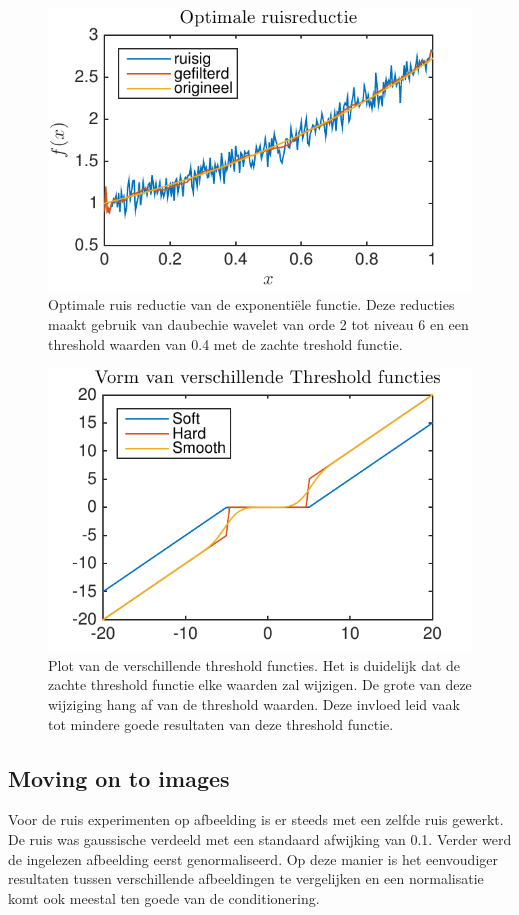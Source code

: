 \begin{figure}
\centering
\includegraphics[width=0.7\linewidth]{../src/denoising/error_1d/Optimale_ruisReductie}
\caption{Optimale ruis reductie van de exponenti\"ele functie. Deze reducties maakt gebruik van daubechie wavelet van orde 2 tot niveau 6 en een threshold waarden van 0.4 met  de zachte treshold functie.}
\label{fig:Optimale_ruisReductie}
\end{figure}

\begin{figure}
\centering
\includegraphics[width=0.7\linewidth]{../src/denoising/error_1d/Threshold}
\caption{Plot van de verschillende threshold functies. Het is duidelijk dat de zachte threshold functie elke waarden zal wijzigen. De grote van deze wijziging hang af van de threshold waarden. Deze invloed leid vaak tot mindere goede resultaten van deze threshold functie.}
\label{fig:Threshold}
\end{figure}






\subsection{Moving on to images}

Voor de ruis experimenten op afbeelding is er steeds met een zelfde ruis gewerkt.
De ruis was gaussische verdeeld met een standaard afwijking van 0.1.
Verder werd de ingelezen afbeelding eerst genormaliseerd.
Op deze manier is het eenvoudiger resultaten tussen verschillende afbeeldingen te vergelijken en een normalisatie komt ook meestal ten goede van de conditionering.

